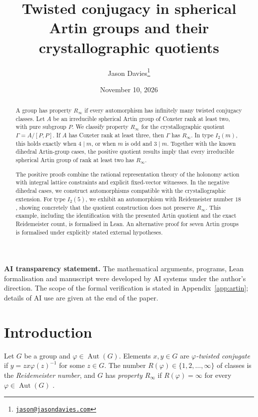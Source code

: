 \documentclass[11pt]{article}
\title{Twisted conjugacy in spherical Artin groups and their crystallographic quotients}
\author{Jason Davies\thanks{\href{mailto:jason@jasondavies.com}{\nolinkurl{jason@jasondavies.com}}}}
\date{November 10, 2026}
\theoremstyle{definition}
\newcommand{\Aut}{\operatorname{Aut}}
\newcommand{\Rinf}{R_\infty}
\begin{document}
\maketitle

\begin{abstract}
A group has property $\Rinf$ if every automorphism has infinitely many twisted conjugacy classes.
Let $A$ be an irreducible spherical Artin group of Coxeter rank at least two, with pure subgroup $P$.
We classify property $\Rinf$ for the crystallographic quotient $\Gamma=A/[P,P]$.
If $A$ has Coxeter rank at least three, then $\Gamma$ has $\Rinf$.
In type $I_2(m)$, this holds exactly when $4\mid m$, or when $m$ is odd and $3\mid m$.
Together with the known dihedral Artin-group cases, the positive quotient results imply that
every irreducible spherical Artin group of rank at least two has $\Rinf$.

The positive proofs combine the rational representation theory of the holonomy action with
integral lattice constraints and explicit fixed-vector witnesses. In the negative dihedral cases,
we construct automorphisms compatible with the crystallographic extension. For type $I_2(5)$,
we exhibit an automorphism with Reidemeister number $18$, showing concretely that the quotient
construction does not preserve $\Rinf$. This example, including the identification with the
presented Artin quotient and the exact Reidemeister count, is formalised in Lean.
An alternative proof for seven Artin groups is formalised under explicitly stated external hypotheses.
\end{abstract}

\noindent\textbf{AI transparency statement.} The mathematical arguments, programs, Lean formalisation
and manuscript were developed by AI systems under the author's direction. The scope of the formal
verification is stated in Appendix~\ref{app:artin}; details of AI use are given at the end of the paper.

\section{Introduction}

Let $G$ be a group and $\varphi\in\Aut(G)$. Elements $x,y\in G$ are \emph{$\varphi$-twisted conjugate} if
$y=zx\varphi(z)^{-1}$ for some $z\in G$. The number $R(\varphi)\in\{1,2,\dots,\infty\}$ of classes is the
\emph{Reidemeister number}, and $G$ has \emph{property $\Rinf$} if $R(\varphi)=\infty$ for every
$\varphi\in\Aut(G)$ \cite{FT15,FN16}.
\end{document}
